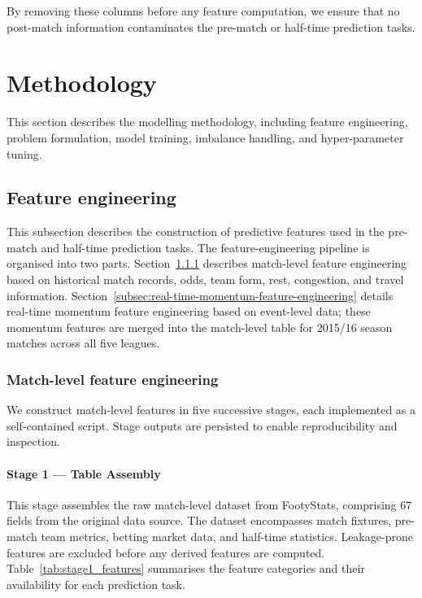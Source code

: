 \documentclass[pdflatex,sn-mathphys-num]{sn-jnl}
\theoremstyle{thmstyleone}
\theoremstyle{thmstyletwo}
\theoremstyle{thmstylethree}
\begin{document}
By removing these columns before any feature computation, we ensure that no post-match information contaminates the pre-match or half-time prediction tasks.

\section{Methodology}\label{sec:method}

This section describes the modelling methodology, including feature engineering, problem formulation, model training, imbalance handling, and hyper-parameter tuning.

\subsection{Feature engineering}\label{sec:features}

This subsection describes the construction of predictive features used in the pre-match and half-time prediction tasks. The feature-engineering pipeline is organised into two parts. Section~\ref{subsec:match-level-feature-engineering} describes match-level feature engineering based on historical match records, odds, team form, rest, congestion, and travel information. Section~\ref{subsec:real-time-momentum-feature-engineering} details real-time momentum feature engineering based on event-level data; these momentum features are merged into the match-level table for 2015/16 season matches across all five leagues.

\subsubsection{Match-level feature engineering}
\label{subsec:match-level-feature-engineering}

We construct match-level features in five successive stages, each implemented
as a self-contained script. Stage outputs are persisted to enable
reproducibility and inspection.

\paragraph{Stage 1 --- Table Assembly}\label{subsec:stage1-table-assembly}

This stage assembles the raw match-level dataset from FootyStats, comprising 67 fields from the original data source. The dataset encompasses match fixtures, pre-match team metrics, betting market data, and half-time statistics. Leakage-prone features are excluded before any derived features are computed. Table~\ref{tab:stage1_features} summarises the feature categories and their availability for each prediction task.
\end{document}
